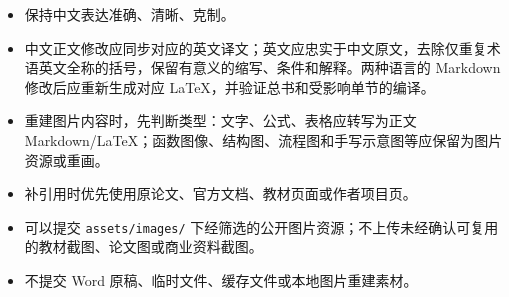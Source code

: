 \begin{itemize}
\tightlist
\item
  保持中文表达准确、清晰、克制。
\item
  中文正文修改应同步对应的英文译文；英文应忠实于中文原文，去除仅重复术语英文全称的括号，保留有意义的缩写、条件和解释。两种语言的 Markdown 修改后应重新生成对应 LaTeX，并验证总书和受影响单节的编译。
\item
  重建图片内容时，先判断类型：文字、公式、表格应转写为正文 Markdown/LaTeX；函数图像、结构图、流程图和手写示意图等应保留为图片资源或重画。
\item
  补引用时优先使用原论文、官方文档、教材页面或作者项目页。
\item
  可以提交 \texttt{assets/images/} 下经筛选的公开图片资源；不上传未经确认可复用的教材截图、论文图或商业资料截图。
\item
  不提交 Word 原稿、临时文件、缓存文件或本地图片重建素材。
\end{itemize}

\clearpage
